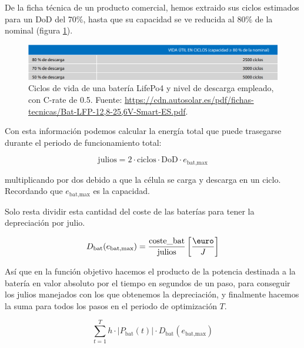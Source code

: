 De la ficha técnica de un producto comercial, hemos extraido sus ciclos
estimados para un DoD del 70\%, hasta que su capacidad se ve reducida al
80\% de la nominal (figura \ref{fig:battery_datasheet_cycles}).

\begin{figure}[h] \centering
	\centering
	\includegraphics[width=1\textwidth]{./capitulos/resultados_discusion/images/battery_datasheet_cycles.png}
	\caption{Ciclos de vida de una batería LifePo4 y nivel de descarga empleado,
		con C-rate de 0.5. Fuente:
		\url{https://cdn.autosolar.es/pdf/fichas-tecnicas/Bat-LFP-12,8-25,6V-Smart-ES.pdf}.}
	\label{fig:battery_datasheet_cycles}
\end{figure}

Con esta información podemos calcular la energía total que puede trasegarse durante
el periodo de funcionamiento total:

\begin{equation} \label{eq:battery_life_joules}
	\text{julios} = 2 \cdot \text{ciclos} \cdot \text{DoD} \cdot e_\text{bat,max}
\end{equation}

multiplicando por dos debido a que la célula se carga y descarga en un ciclo.
Recordando que $e_\text{bat,max}$ es la capacidad.

Solo resta dividir esta cantidad del coste de las baterías para tener la depreciación
por julio.

\begin{equation} \label{eq:battery_depreciation_by_joule}
	D_\text{bat}(e_\text{bat,max}) = \frac{\text{coste\_bat}}{\text{julios}} \left[\frac{\text{\euro}}{J}\right]
\end{equation}

Así que en la función objetivo hacemos el producto de la potencia destinada a
la batería en valor absoluto por el tiempo en segundos de un paso, para
conseguir los julios manejados con los que obtenemos la depreciación, y
finalmente hacemos la suma para todos los pasos en el periodo de optimización $T$.

\begin{equation}
	\sum_{t=1}^{T} h \cdot |P_\text{bat}(t)| \cdot D_\text{bat}(e_\text{bat,max})
\end{equation}

